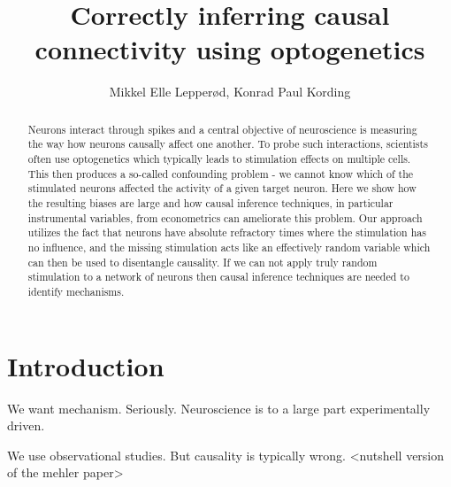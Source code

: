 \documentclass[11pt]{article}
\title{Correctly inferring causal connectivity using optogenetics}
\author{Mikkel Elle Lepper\o{}d, Konrad Paul Kording}
\begin{document}
\maketitle

\begin{abstract}
\noindent Neurons interact through spikes and a central objective of neuroscience is measuring the way how neurons causally affect one another. To probe such interactions, scientists often use optogenetics which typically leads to stimulation effects on multiple cells. This then produces a so-called confounding problem - we cannot know which of the stimulated neurons affected the activity of a given target neuron. Here we show how the resulting biases are large and how causal inference techniques, in particular instrumental variables, from econometrics can ameliorate this problem. Our approach utilizes the fact that neurons have absolute refractory times where the stimulation has no influence, and the missing stimulation acts like an effectively random variable which can then be used to disentangle causality. If we can not apply truly random stimulation to a network of neurons then causal inference techniques are needed to identify mechanisms.
\end{abstract}

\section{Introduction}

We want mechanism. Seriously. Neuroscience is to a large part experimentally driven.

We use observational studies. But causality is typically wrong. <nutshell version of the mehler paper>
\end{document}
